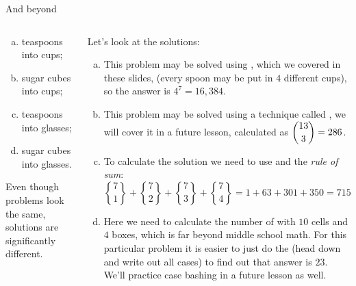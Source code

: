 \documentclass[9pt,aspectratio=169]{beamer}
\newcommand{\genstirlingII}[3]{%
  \genfrac{\{}{\}}{0pt}{#1}{#2}{#3}%
}
\newcommand{\stirlingII}[2]{\genstirlingII{}{#1}{#2}}
\begin{document}
\begin{frame}{And beyond}
\begin{columns}[T]
\begin{column}{0.5\textwidth}
\begin{problem}
        \begin{enumerate}[a)]
          \item teaspoons into cups;
          \item sugar cubes into cups;
          \item teaspoons into glasses;
          \item sugar cubes into glasses.
        \end{enumerate}
      \end{problem}
      \begin{figure}\end{figure}
      Even though problems look the same, solutions are significantly different.
    \end{column}
    \begin{column}{0.5\textwidth}
      {\small
      Let's look at the solutions:
      \begin{enumerate}[a)]
        \item This problem may be solved using , which we covered in these slides, (every spoon may be put in $4$ different cups), so the answer is $4^7 = 16,384$.
        \item This problem may be solved using a technique called , we will cover it in a future lesson, calculated as $\dbinom{13}{3} = 286$.
        \item To calculate the solution we need to use  and the \emph{rule of sum}:
        \[ \stirlingII{7}{1}+\stirlingII{7}{2}+\stirlingII{7}{3}+\stirlingII{7}{4}=1+63+301+350=715. \]\vspace*{-1ex}
        \item Here we need to calculate the number of  with $10$ cells and $4$ boxes, which is far beyond middle school math. For this particular problem it is easier to just do the  (head down and write out all cases) to find out that answer is $23$.  We’ll practice case bashing in a future lesson as well.
      \end{enumerate}
      }
    \end{column}
  \end{columns}
\end{frame}
\end{document}
